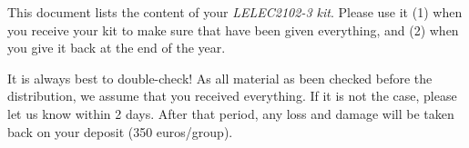 This document lists the content of your \textit{LELEC2102-3 kit}. Please use it (1) when you receive your kit to make sure that have been given everything, and (2) when you give it back at the end of the year.

\begin{bclogo}[couleur = gray!20, arrondi = 0.2, logo=\bcattention]{It is always best to double-check!}
As all material as been checked before the distribution, we assume that you received everything. If it is not the case, please let us know within 2 days. After that period, any loss and damage will be taken back on your deposit (350 euros/group).
\end{bclogo}
